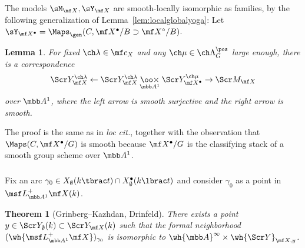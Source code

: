 \documentclass[final]{amsart}
\newtheorem{thm}[subsubsection]{Theorem}
\newtheorem{lem}[subsubsection]{Lemma}
\theoremstyle{remark}
\theoremstyle{definition}
\numberwithin{equation}{section}
\begin{document}
The models $\sM_{\mf X}, \sY_{\mf X}$ are smooth-locally isomorphic 
as families, by the following generalization of Lemma~\ref{lem:localglobalyoga}: 
Let $\sY_{\mf X^\bullet} = \Maps_\gen(C, \mf X^\bullet/B \supset \mf X^\circ/B)$. 

\begin{lem}\label{lem:yoga-fam}
For fixed $\ch\lambda\in \mf c_X$ and any $\ch\mu\in \ch\Lambda^\pos_G$ large enough,
there is a correspondence 
\begin{equation}\label{e:Ycorrespondence}
    \Scr Y^{\ch\lambda}_{\mf X} \leftarrow \Scr Y^{\ch\lambda}_{\mf X} \mathbin{\underset{\mbb A^1}{\oo\times}} \Scr Y^{\ch\mu}_{\mf X^\bullet} \to \Scr M_{\mf X} 
\end{equation}
over $\mbb A^1$, where the left arrow is smooth surjective and the right arrow is smooth. 
\end{lem}
The proof is the same as in \emph{loc cit.}, together with the observation that
$\Maps(C, \mf X^\bullet/G)$ is smooth because $\mf X^\bullet/G$ is the classifying stack
of a smooth group scheme over $\mbb A^1$. 

\subsubsection{}
Fix an arc $\gamma_0 \in X_\emptyset(k\tbrac t) \cap X_\emptyset^\bullet(k\lbrac t)$
and consider $\gamma_0$ as a point in $\msf L^+_{\mbb A^1} \mf X (k)$.

\begin{thm}[Grinberg--Kazhdan, Drinfeld]  \label{thm:DGKfamily}
There exists a point $y \in \Scr Y_\emptyset(k) \subset \Scr Y_{\mf X}(k)$
such that the formal neighborhood $(\wh{\msf L^+_{\mbb A^1} \mf X})_{\gamma_0}$ 
is isomorphic to $\wh{\mbb A}^\infty \times \wh{\Scr Y}_{\mf X, y}$. 
\end{thm}
\end{document}
